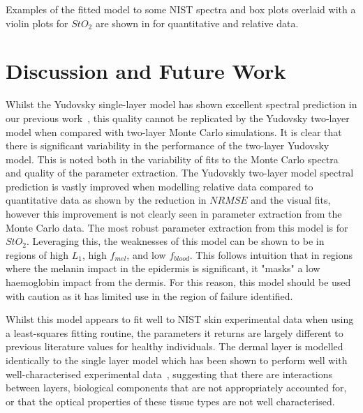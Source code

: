 Examples of the fitted model to some NIST spectra and box plots overlaid with a violin plots for $StO_2$ are shown in  for quantitative and relative data. 
\FloatBarrier

\section{Discussion and Future Work}\label{sec:discussion2}
Whilst the Yudovsky single-layer model has shown excellent spectral prediction in our previous work~\cite{Bahl2023a}, this quality cannot be replicated by the Yudovsky two-layer model when compared with two-layer Monte Carlo simulations. It is clear that there is significant variability in the performance of the two-layer Yudovsky model. This is noted both in the variability of fits to the Monte Carlo spectra and quality of the parameter extraction. The Yudovskly two-layer model spectral prediction is vastly improved when modelling relative data compared to quantitative data as shown by the reduction in $NRMSE$ and the visual fits, however this improvement is not clearly seen in parameter extraction from the Monte Carlo data. The most robust parameter extraction from this model is for $StO_2$. Leveraging this, the weaknesses of this model can be shown to be in regions of high $L_1$, high $f_{mel}$, and low $f_{blood}$. This follows intuition that in regions where the melanin impact in the epidermis is significant, it "masks" a low haemoglobin impact from the dermis. For this reason, this model should be used with caution as it has limited use in the region of failure identified.

Whilst this model appears to fit well to NIST skin experimental data when using a least-squares fitting routine, the parameters it returns are largely different to previous literature values for healthy individuals. The dermal layer is modelled identically to the single layer model which has been shown to perform well with well-characterised experimental data~\cite{Bahl2023a}, suggesting that there are interactions between layers, biological components that are not appropriately accounted for, or that the optical properties of these tissue types are not well characterised.  

